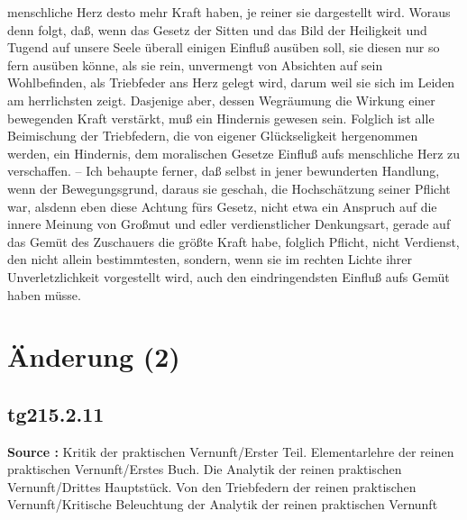 \documentclass[a4paper,12pt,twoside]{book}
\newcommand{\unnumberedsection}[1]{
	\section*{#1}
	\addcontentsline{toc}{section}{#1}
	\markright{#1}
}
\begin{document}
menschliche Herz desto mehr Kraft haben, je reiner sie dargestellt wird. Woraus denn folgt, daß, wenn das Gesetz der Sitten und das Bild der Heiligkeit und Tugend auf unsere Seele überall einigen Einfluß ausüben soll, sie diesen nur so fern ausüben könne, als sie rein, unvermengt von Absichten auf sein Wohlbefinden, als Triebfeder ans Herz gelegt wird, darum weil sie sich im Leiden am herrlichsten zeigt. Dasjenige aber, dessen Wegräumung die Wirkung einer bewegenden Kraft verstärkt, muß ein Hindernis gewesen sein. Folglich ist alle Beimischung der Triebfedern, die von eigener Glückseligkeit hergenommen werden, ein Hindernis, dem moralischen Gesetze Einfluß aufs menschliche Herz zu verschaffen. – Ich behaupte ferner, daß selbst in jener bewunderten Handlung, wenn der Bewegungsgrund, daraus sie geschah, die Hochschätzung seiner Pflicht war, alsdenn eben diese Achtung fürs Gesetz, nicht etwa ein Anspruch  auf die innere Meinung von Großmut und edler verdienstlicher Denkungsart, gerade auf das Gemüt des Zuschauers die größte Kraft habe, folglich Pflicht, nicht Verdienst, den nicht allein bestimmtesten, sondern, wenn sie im rechten Lichte ihrer Unverletzlichkeit vorgestellt wird, auch den eindringendsten Einfluß aufs Gemüt haben müsse. 
	
	\unnumberedsection{Änderung (2)} 
	\subsection*{tg215.2.11} 
	\textbf{Source : }Kritik der praktischen Vernunft/Erster Teil. Elementarlehre der reinen praktischen Vernunft/Erstes Buch. Die Analytik der reinen praktischen Vernunft/Drittes Hauptstück. Von den Triebfedern der reinen praktischen Vernunft/Kritische Beleuchtung der Analytik der reinen praktischen Vernunft\\  
	
\end{document}
